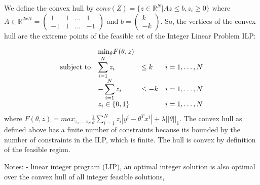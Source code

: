 \documentclass[10pt]{article}
\newenvironment{exercise}[2][Exercise]{\begin{trivlist}
  \item[\hskip \labelsep {\bfseries #1}\hskip \labelsep {\bfseries #2.}]}{\end{trivlist}}
\begin{document}
\begin{exercise}{6}
 We define the convex hull by $conv(Z)= \{ z \in\mathbb{R}^N | Az\leq b, z_i \geq 0 \}$ where $A \in\mathbb{R}^{2xN} = \begin{pmatrix}
1 & 1 & ... & 1\\
-1 & 1 & ... & -1
\end{pmatrix}$ and $ b = \begin{pmatrix}k\\-k
\end{pmatrix}$. So, the vertices of the convex hull are the extreme points of the feasible set of the Integer Linear Problem ILP:

\begin{equation}
\begin{array}{l@{}llll}
&&\text{min}_\theta F(\theta, z)\\
\text{subject to} 
&& \displaystyle\sum_{i=1}^{N}z_i &\leq k & i=1 ,\dots, N \\
&& -\displaystyle\sum_{i=1}^{N}z_i &\leq -k & i=1 ,\dots, N  \\
&& z_i \in \{0,1\} && i=1 ,\dots, N 
\end{array}
\end{equation}
where $F(\theta, z) = max_{z_1, ...z_N} \displaystyle\frac{1}{k} \sum_{i=1}^{N}z_i|y^i-\theta^Tx^i|+\lambda || \theta||_1$. 
The convex hull as defined above has a finite number of constraints because its bounded by the number of constraints in the ILP, which is finite. The hull is convex by definition of the feasible region. 


Notes:
- linear integer program (LIP), an optimal integer solution is also optimal over the
convex hull of all integer feasible solutions,

\end{exercise}
\end{document}

